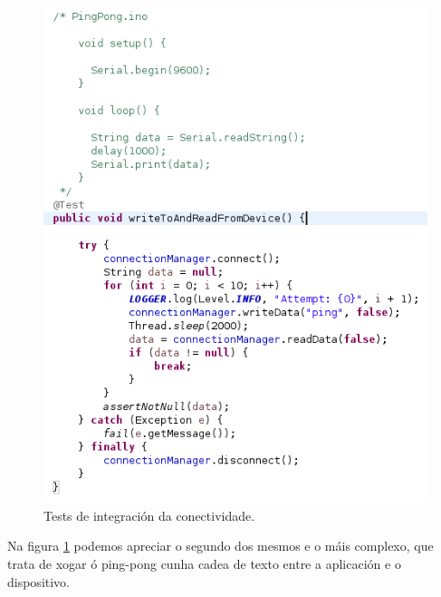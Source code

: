  \begin{figure}[htbp]
  \centering
  \includegraphics[scale=0.8,keepaspectratio=true]{./imagenes/test-integracion-conectividade.png}
  \caption{Tests de integración da conectividade.}
  \label{figura:TestIntegracionConectividade}
 \end{figure}
 
 Na figura \ref{figura:TestIntegracionConectividade} podemos apreciar o segundo
 dos mesmos e o máis complexo, que trata de xogar ó ping-pong cunha cadea de
 texto entre a aplicación e o dispositivo. \\
 
